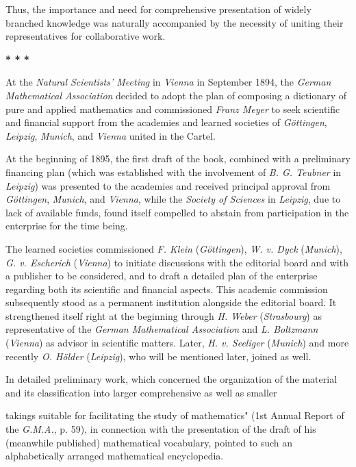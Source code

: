 \thispagestyle{fancy}

\vspace{0.5cm}

Thus, the importance and need for comprehensive presentation of widely branched knowledge was naturally accompanied by the necessity of uniting their representatives for collaborative work.

\vspace{0.3cm}
\centerline{\textbf{* * *}}
\vspace{0.3cm}

At the \textit{Natural Scientists' Meeting} in \textit{Vienna} in September 1894, the \textit{German Mathematical Association} decided to adopt the plan of composing a dictionary of pure and applied mathematics and commissioned \textit{Franz Meyer} to seek scientific and financial support from the academies and learned societies of \textit{Göttingen}, \textit{Leipzig}, \textit{Munich}, and \textit{Vienna} united in the Cartel.

At the beginning of 1895, the first draft of the book, combined with a preliminary financing plan (which was established with the involvement of \textit{B. G. Teubner} in \textit{Leipzig}) was presented to the academies and received principal approval from \textit{Göttingen}, \textit{Munich}, and \textit{Vienna}, while the \textit{Society of Sciences} in \textit{Leipzig}, due to lack of available funds, found itself compelled to abstain from participation in the enterprise for the time being.

The learned societies commissioned \textit{F. Klein} (\textit{Göttingen}), \textit{W. v. Dyck} (\textit{Munich}), \textit{G. v. Escherich} (\textit{Vienna}) to initiate discussions with the editorial board and with a publisher to be considered, and to draft a detailed plan of the enterprise regarding both its scientific and financial aspects. This academic commission subsequently stood as a permanent institution alongside the editorial board. It strengthened itself right at the beginning through \textit{H. Weber} (\textit{Strasbourg}) as representative of the \textit{German Mathematical Association} and \textit{L. Boltzmann} (\textit{Vienna}) as advisor in scientific matters. Later, \textit{H. v. Seeliger} (\textit{Munich}) and more recently \textit{O. Hölder} (\textit{Leipzig}), who will be mentioned later, joined as well.

In detailed preliminary work, which concerned the organization of the material and its classification into larger comprehensive as well as smaller

\vfill
\leftline{\rule{2in}{0.4pt}}
\vspace{0.2cm}
{
\footnotesize takings suitable for facilitating the study of mathematics" (1st Annual Report of the \textit{G.M.A.}, p. 59), in connection with the presentation of the draft of his (meanwhile published) mathematical vocabulary, pointed to such an alphabetically arranged mathematical encyclopedia.

}

